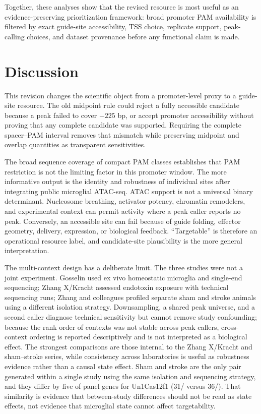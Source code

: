 \documentclass[11pt]{article}
\begin{document}
Together, these analyses show that the revised resource is most useful as an evidence-preserving prioritization framework: broad promoter PAM availability is filtered by exact guide-site accessibility, TSS choice, replicate support, peak-calling choices, and dataset provenance before any functional claim is made.

\section{Discussion}

This revision changes the scientific object from a promoter-level proxy to a guide-site resource. The old midpoint rule could reject a fully accessible candidate because a peak failed to cover $-225$ bp, or accept promoter accessibility without proving that any complete candidate was supported. Requiring the complete spacer--PAM interval removes that mismatch while preserving midpoint and overlap quantities as transparent sensitivities.

The broad sequence coverage of compact PAM classes establishes that PAM restriction is not the limiting factor in this promoter window. The more informative output is the identity and robustness of individual sites after integrating public microglial ATAC-seq. ATAC support is not a universal binary determinant. Nucleosome breathing, activator potency, chromatin remodelers, and experimental context can permit activity where a peak caller reports no peak. Conversely, an accessible site can fail because of guide folding, effector geometry, delivery, expression, or biological feedback. ``Targetable'' is therefore an operational resource label, and candidate-site plausibility is the more general interpretation.

The multi-context design has a deliberate limit. The three studies were not a joint experiment. Gosselin used ex vivo homeostatic microglia and single-end sequencing; Zhang X/Kracht assessed endotoxin exposure with technical sequencing runs; Zhang and colleagues profiled separate sham and stroke animals using a different isolation strategy. Downsampling, a shared peak universe, and a second caller diagnose technical sensitivity but cannot remove study confounding; because the rank order of contexts was not stable across peak callers, cross-context ordering is reported descriptively and is not interpreted as a biological effect. The strongest comparisons are those internal to the Zhang X/Kracht and sham--stroke series, while consistency across laboratories is useful as robustness evidence rather than a causal state effect. Sham and stroke are the only pair generated within a single study using the same isolation and sequencing strategy, and they differ by five of \NPanel{} panel genes for Un1Cas12f1 (31/\NPanel{} versus 36/\NPanel{}). That similarity is evidence that between-study differences should not be read as state effects, not evidence that microglial state cannot affect targetability.
\end{document}
